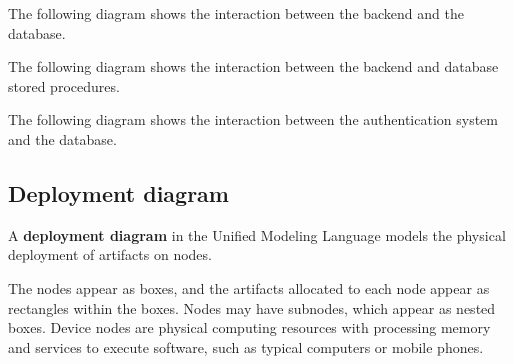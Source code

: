 \documentclass[12pt]{report}
\renewcommand\emph{\textbf}
\begin{document}

                \newpage

                The following diagram shows the interaction between the backend and the database.


                \newpage

                The following diagram shows the interaction between the backend and database stored procedures.


                \newpage

                The following diagram shows the interaction between the authentication system and the database.


                \newpage

                \newpage

            \subsection{Deployment diagram}

                A \emph{deployment diagram} in the Unified Modeling Language models the physical deployment of artifacts on nodes.

                The nodes appear as boxes, and the artifacts allocated to each node appear as rectangles within the boxes. Nodes may have subnodes, which appear as nested boxes. Device nodes are physical computing resources with processing memory and services to execute software, such as typical computers or mobile phones.

\end{document}
